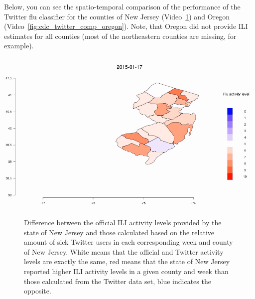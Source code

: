 \documentclass[11pt, a4paper,twoside]{report}\usepackage[]{graphicx}\usepackage[]{color}
\begin{document}
Below, you can see the spatio-temporal comparison of the performance of the Twitter flu classifier for the counties of New Jersey (Video~\ref{fig:cdc_twitter_comp_jersey}) and Oregon (Video~\ref{fig:cdc_twitter_comp_oregon}). Note, that Oregon did not provide ILI estimates for all counties (most of the northeastern counties are missing, for example).

\begin{center}
\href{run:vids/5_cdc_twitter_diff_user_jersey.avi}{\includegraphics[width=0.9\linewidth]{vids/5_cdc_twitter_diff_user_jersey.png}}
\end{center}
\begin{figure}[htbp!]
\centering
  \caption{Difference between the official ILI activity levels provided by the state of New Jersey and those calculated based on the relative amount of sick Twitter users in each corresponding week and county of New Jersey. White means that the official and Twitter activity levels are exactly the same, red means that the state of New Jersey reported higher ILI activity levels in a given county and week than those calculated from the Twitter data set, blue indicates the opposite.}
    \label{fig:cdc_twitter_comp_jersey}
\end{figure}
\end{document}
